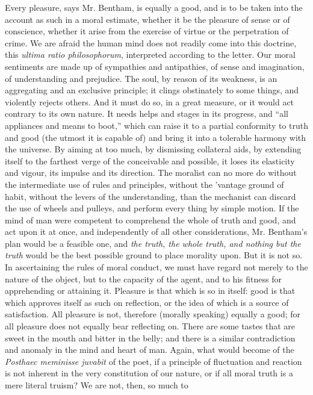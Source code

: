 Every pleasure, says Mr. Bentham, is equally a good, and is to be
taken into the account as such in a moral estimate, whether it be
the pleasure of sense or of conscience, whether it arise from the
exercise of virtue or the perpetration of crime. We are afraid the
human mind does not readily come into this doctrine, this
\emph{ultima ratio philosophorum}, interpreted according to the
letter. Our moral sentiments are made up of sympathies and
antipathies, of sense and imagination, of understanding and
prejudice. The soul, by reason of its weakness, is an aggregating
and an exclusive principle; it clings obstinately to some things,
and violently rejects others. And it must do so, in a great
measure, or it would act contrary to its own nature. It needs
helps and stages in its progress, and ``all appliances and means
to boot,'' which can raise it to a partial conformity to truth and
good (the utmost it is capable of) and bring it into a tolerable
harmony with the universe. By aiming at too much, by dismissing
collateral aids, by extending itself to the farthest verge of the
conceivable and possible, it loses its elasticity and vigour, its
impulse and its direction. The moralist can no more do without the
intermediate use of rules and principles, without the 'vantage
ground of habit, without the levers of the understanding, than the
mechanist can discard the use of wheels and pulleys, and perform
every thing by simple motion. If the mind of man were competent to
comprehend the whole of truth and good, and act upon it at once,
and independently of all other considerations, Mr. Bentham's plan
would be a feasible one, and \emph{the truth, the whole truth, and
nothing but the truth} would be the best possible ground to place
morality upon. But it is not so. In ascertaining the rules of
moral conduct, we must have regard not merely to the nature of the
object, but to the capacity of the agent, and to his fitness for
apprehending or attaining it. Pleasure is that which is so in
itself: good is that which approves itself as such on reflection,
or the idea of which is a source of satisfaction.  All pleasure is
not, therefore (morally speaking) equally a good; for all pleasure
does not equally bear reflecting on. There are some tastes that
are sweet in the mouth and bitter in the belly; and there is a
similar contradiction and anomaly in the mind and heart of
man. Again, what would become of the \emph{Posthaec meminisse
juvabit} of the poet, if a principle of fluctuation and reaction
is not inherent in the very constitution of our nature, or if all
moral truth is a mere literal truism? We are not, then, so much to
